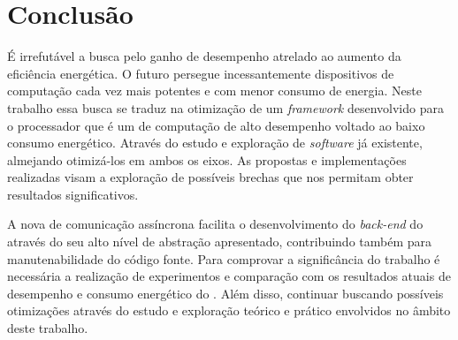 %

\chapter{Conclusão}
\label{cap:conclusao}

É irrefutável a busca pelo ganho de desempenho atrelado ao aumento da eficiência energética. O futuro persegue incessantemente dispositivos de computação cada vez mais potentes e com menor consumo de energia. Neste trabalho essa busca se traduz na otimização de um \textit{framework} desenvolvido para o processador \mppa que é um \chip de computação de alto desempenho voltado ao baixo consumo energético. Através do estudo e exploração de \textit{software} já existente, almejando otimizá-los em ambos os eixos. As propostas e implementações realizadas visam a exploração de possíveis brechas que nos permitam obter resultados significativos.

A nova \api de comunicação assíncrona facilita o desenvolvimento do \textit{back-end} do \fw através do seu alto nível de abstração apresentado, contribuindo também para manutenabilidade do código fonte. Para comprovar a significância do trabalho é necessária a realização de experimentos e comparação com os resultados atuais de desempenho e consumo energético do \pskelmppa. Além disso, continuar buscando possíveis otimizações através do estudo e exploração teórico e prático envolvidos no âmbito deste trabalho.



